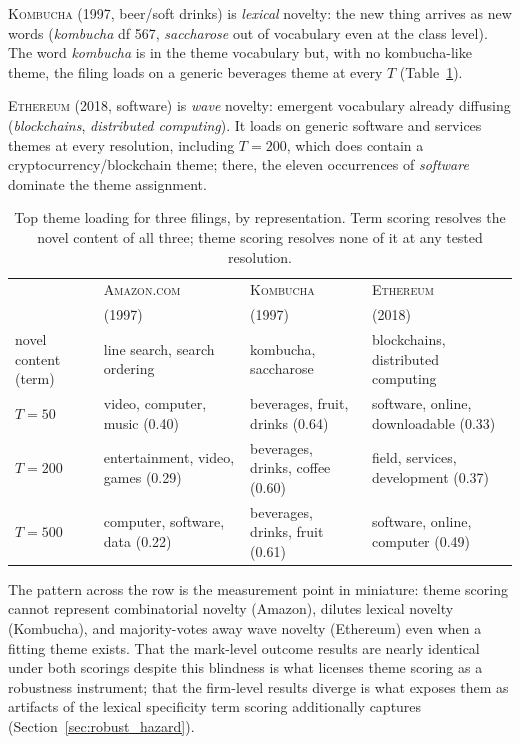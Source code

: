 \textsc{Kombucha} (1997, beer/soft drinks) is \emph{lexical} novelty: the
new thing arrives as new words (\emph{kombucha} df 567, \emph{saccharose}
out of vocabulary even at the class level). The word \emph{kombucha} is in
the theme vocabulary but, with no kombucha-like theme, the filing loads on
a generic beverages theme at every $T$ (Table~\ref{tab:exhibit}).

\textsc{Ethereum} (2018, software) is \emph{wave} novelty: emergent
vocabulary already diffusing (\emph{blockchains}, \emph{distributed
computing}). It loads on generic software and services themes at every
resolution, including $T = 200$, which does contain a
cryptocurrency/blockchain theme; there, the eleven occurrences of
\emph{software} dominate the theme assignment.

\begin{table}[!htbp]\centering\small
\caption{Top theme loading for three filings, by representation. Term
scoring resolves the novel content of all three; theme scoring resolves
none of it at any tested resolution.}
\label{tab:exhibit}
\begin{tabular}{lp{3.1cm}p{3.1cm}p{3.1cm}}
\toprule
& \textsc{Amazon.com} & \textsc{Kombucha} & \textsc{Ethereum} \\
& (1997) & (1997) & (2018) \\
\midrule
novel content (term) & line search, search ordering & kombucha, saccharose & blockchains, distributed computing \\
$T=50$ & video, computer, music (0.40) & beverages, fruit, drinks (0.64) & software, online, downloadable (0.33) \\
$T=200$ & entertainment, video, games (0.29) & beverages, drinks, coffee (0.60) & field, services, development (0.37) \\
$T=500$ & computer, software, data (0.22) & beverages, drinks, fruit (0.61) & software, online, computer (0.49) \\
\bottomrule
\end{tabular}
\end{table}

The pattern across the row is the measurement point in miniature: theme
scoring cannot represent combinatorial novelty (Amazon), dilutes lexical
novelty (Kombucha), and majority-votes away wave novelty (Ethereum) even
when a fitting theme exists. That the mark-level outcome results are
nearly identical under both scorings despite this blindness is what
licenses theme scoring as a robustness instrument; that the firm-level
results diverge is what exposes them as artifacts of the lexical
specificity term scoring additionally captures
(Section~\ref{sec:robust_hazard}).

